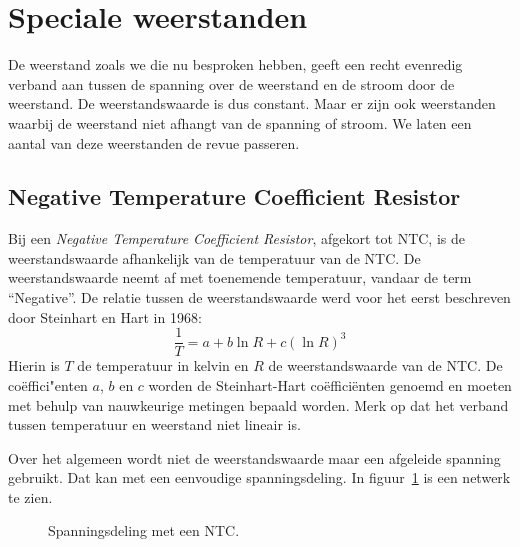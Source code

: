 \fi

\section{Speciale weerstanden}
De weerstand zoals we die nu besproken hebben, geeft een recht evenredig verband aan tussen de spanning over de weerstand en de stroom door de weerstand. De weerstandswaarde is dus constant. Maar er zijn ook weerstanden waarbij de weerstand niet afhangt van de spanning of stroom. We laten een aantal van deze weerstanden de revue passeren.

\subsection{Negative Temperature Coefficient Resistor}
Bij een \textsl{Negative Temperature Coefficient Resistor}, afgekort tot NTC, is de weerstandswaarde afhankelijk van de temperatuur van de NTC. De weerstandswaarde neemt af met toenemende temperatuur, vandaar de term ``Negative''. De relatie tussen de weerstandswaarde werd voor het eerst beschreven door Steinhart en Hart in 1968:
%
\begin{equation}
\dfrac{1}{T} = a + b\ln R + c (\ln R)^3
\end{equation}
%
Hierin is $T$ de temperatuur in kelvin en $R$ de weerstandswaarde van de NTC. De co\"effici"enten $a$, $b$ en $c$ worden de Steinhart-Hart co\"effici\"enten genoemd en moeten met behulp van nauwkeurige metingen bepaald worden. Merk op dat het verband tussen temperatuur en weerstand niet lineair is.

Over het algemeen wordt niet de weerstandswaarde maar een afgeleide spanning gebruikt. Dat kan met een eenvoudige spanningsdeling. In figuur~\ref{fig:gelspanningsdelingmetntc} is een netwerk te zien.

\begin{figure}[!ht]
\centering
{}
\caption{Spanningsdeling met een NTC.}
\label{fig:gelspanningsdelingmetntc}
\end{figure}

